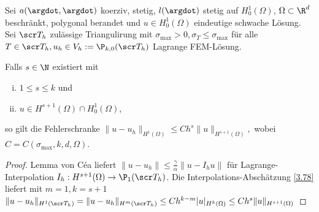 \begin{st} \label{3.82}
	Sei $a(\argdot, \argdot)$ koerziv, stetig, $l(\argdot)$ stetig auf $H_0^1(\Omega)$, $\Omega \subset \R^d$ beschränkt, polygonal berandet und $u \in H_0^1(\Omega)$ eindeutige schwache Lösung.
	Sei $\scr T_h$ zulässige Triangulirung mit $\sigma_{\text{max}} > 0, \sigma_T \le \sigma_{\text{max}}$ für alle $T \in \scr T_h, u_h \in V_h := \P_{k,0}(\scr T_h)$ Lagrange FEM-Lösung.

	Falls $s \in \N$ existiert mit
	\begin{enumerate}[i)]
		\item
			$1 \le s \le k$ und
		\item
			$u \in H^{s+1}(\Omega) \cap H_0^1(\Omega)$,
	\end{enumerate}
	so gilt die Fehlerschranke
	\begin{math}
		\|u - u_h\|_{H^1(\Omega)}
		\le C h^s \|u\|_{H^{s+1}(\Omega)},
	\end{math}
	wobei $C = C(\sigma_{\text{max}}, k, d, \Omega)$.
	\begin{proof}
		Lemma von Céa liefert
		\begin{math}
			\|u - u_h\| \le \frac{\gamma}{\alpha} \|u - I_hu\|
		\end{math}
		für Lagrange-Interpolation $I_h: H^{s+1}(\Omega) \to \P_1(\scr T_h)$.
		Die Interpolations-Abschätzung \ref{3.78} liefert mit $m = 1, k = s + 1$
		\begin{math}
			\|u - u_h\|_{H^1(\scr T_h)}
			= \|u - u_h\|_{H^m(\scr T_h)}
			\le C h^{k-m} |u|_{H^k(\Omega)}
			\le C h^s \|u\|_{H^{s+1}(\Omega)}
		\end{math}
	\end{proof}
\end{st}

